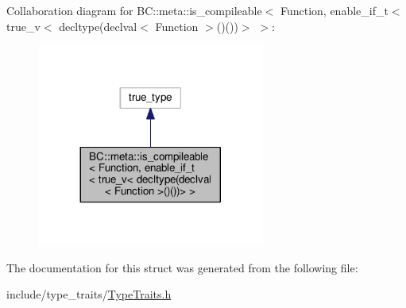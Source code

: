 Collaboration diagram for BC\+:\+:meta\+:\+:is\+\_\+compileable$<$ Function, enable\+\_\+if\+\_\+t$<$ true\+\_\+v$<$ decltype(declval$<$ Function $>$()())$>$ $>$\+:
\nopagebreak
\begin{figure}[H]
\begin{center}
\leavevmode
\includegraphics[width=212pt]{structBC_1_1meta_1_1is__compileable_3_01Function_00_01enable__if__t_3_01true__v_3_01decltype_07de0d8cafd8d4495e933a0f9ef5fbd7291}
\end{center}
\end{figure}


The documentation for this struct was generated from the following file\+:\begin{DoxyCompactItemize}
\item 
include/type\+\_\+traits/\hyperlink{TypeTraits_8h}{Type\+Traits.\+h}\end{DoxyCompactItemize}
